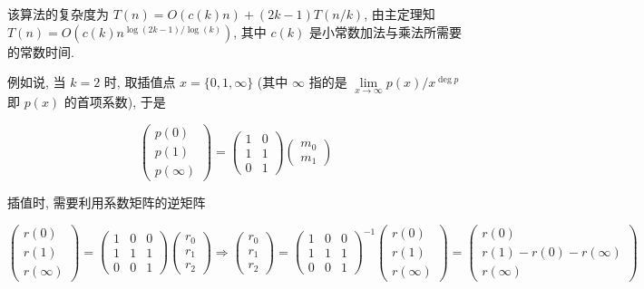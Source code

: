 \documentclass[8pt]{article}
\begin{document}
该算法的复杂度为 $T(n) = O(c(k)n) + (2k-1)T(n/k)$, 由主定理知 $T(n) = O(c(k)n^{\log(2k-1) / \log(k)})$, 其中 $c(k)$ 是小常数加法与乘法所需要的常数时间.

例如说, 当 $k = 2$ 时, 取插值点 $x = \{0, 1, \infty\}$ (其中 $\infty$ 指的是 $\lim\limits_{x \to \infty} p(x) / x^{\deg p}$ 即 $p(x)$ 的首项系数), 于是

$$\begin{pmatrix}
	p(0) \\ p(1) \\ p(\infty)
\end{pmatrix} = 
\begin{pmatrix}
	1 & 0\\
	1 & 1\\
	0 & 1
\end{pmatrix}
\begin{pmatrix}
	m_0 \\ m_1
\end{pmatrix}$$

插值时, 需要利用系数矩阵的逆矩阵

$$\begin{pmatrix}
	r(0) \\ r(1) \\ r(\infty)
\end{pmatrix} = 
\begin{pmatrix}
	1 & 0 & 0\\
	1 & 1 & 1\\
	0 & 0 & 1
\end{pmatrix}
\begin{pmatrix}
	r_0 \\ r_1 \\ r_2
\end{pmatrix}
\Rightarrow
\begin{pmatrix}
	r_0 \\ r_1 \\ r_2
\end{pmatrix} = 
\begin{pmatrix}
	1 & 0 & 0\\
	1 & 1 & 1\\
	0 & 0 & 1
\end{pmatrix}^{-1}
\begin{pmatrix}
	r(0) \\ r(1) \\ r(\infty)
\end{pmatrix} = 
\begin{pmatrix}
	r(0) \\ r(1) - r(0) - r(\infty) \\ r(\infty)
\end{pmatrix}
$$
\end{document}
